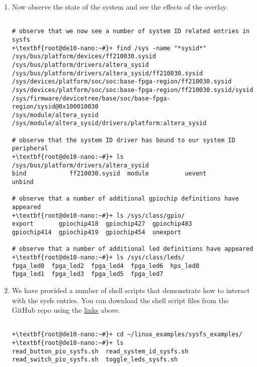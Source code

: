 \begin{flushleft}
\begin{enumerate}[
	label=\textbf{Step \arabic*.},
	leftmargin=*,
	widest={00},
	align=left]
\begin{enumerate}[
	label=\textbf{Step \arabic{enumi}\alph*.},
	leftmargin=*,
	align=left]
\begin{verbatim}
\end{verbatim}

\end{enumerate}

\item Now observe the state of the system and see the effects of the overlay.

\begin{verbatim}

# observe that we now see a number of system ID related entries in sysfs
+\textbf{root@de10-nano:~#}+ find /sys -name "*sysid*"
/sys/bus/platform/devices/ff210030.sysid
/sys/bus/platform/drivers/altera_sysid
/sys/bus/platform/drivers/altera_sysid/ff210030.sysid
/sys/devices/platform/soc/soc:base-fpga-region/ff210030.sysid
/sys/devices/platform/soc/soc:base-fpga-region/ff210030.sysid/sysid
/sys/firmware/devicetree/base/soc/base-fpga-region/sysid@0x100010030
/sys/module/altera_sysid
/sys/module/altera_sysid/drivers/platform:altera_sysid

# observe that the system ID driver has bound to our system ID peripheral
+\textbf{root@de10-nano:~#}+ ls /sys/bus/platform/drivers/altera_sysid
bind            ff210030.sysid  module          uevent          unbind

# observe that a number of additional gpiochip definitions have appeared
+\textbf{root@de10-nano:~#}+ ls /sys/class/gpio/
export       gpiochip418  gpiochip427  gpiochip483
gpiochip414  gpiochip419  gpiochip454  unexport

# observe that a number of additional led definitions have appeared
+\textbf{root@de10-nano:~#}+ ls /sys/class/leds/
fpga_led0  fpga_led2  fpga_led4  fpga_led6  hps_led0
fpga_led1  fpga_led3  fpga_led5  fpga_led7

\end{verbatim}

\item We have provided a number of shell scripts that demonstrate how to interact with the sysfs entries.  You can download the shell script files from the GitHub repo using the \hyperlink{GitHub-files}{\underline{links}} above.

\begin{verbatim}

+\textbf{root@de10-nano:~#}+ cd ~/linux_examples/sysfs_examples/
+\textbf{root@de10-nano:~#}+ ls
read_button_pio_sysfs.sh  read_system_id_sysfs.sh
read_switch_pio_sysfs.sh  toggle_leds_sysfs.sh


\end{verbatim}
\end{enumerate}
\end{flushleft}
